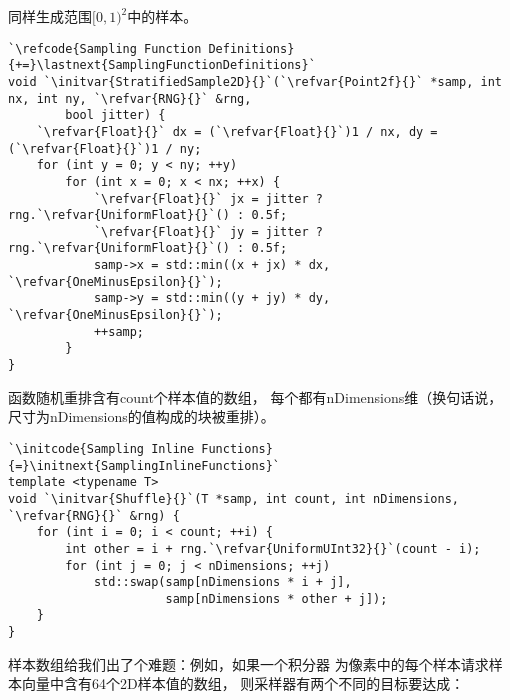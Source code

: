 同样生成范围$[0,1)^2$中的样本。
\begin{lstlisting}
`\refcode{Sampling Function Definitions}{+=}\lastnext{SamplingFunctionDefinitions}`
void `\initvar{StratifiedSample2D}{}`(`\refvar{Point2f}{}` *samp, int nx, int ny, `\refvar{RNG}{}` &rng,
        bool jitter) {
    `\refvar{Float}{}` dx = (`\refvar{Float}{}`)1 / nx, dy = (`\refvar{Float}{}`)1 / ny;
    for (int y = 0; y < ny; ++y)
        for (int x = 0; x < nx; ++x) {
            `\refvar{Float}{}` jx = jitter ? rng.`\refvar{UniformFloat}{}`() : 0.5f;
            `\refvar{Float}{}` jy = jitter ? rng.`\refvar{UniformFloat}{}`() : 0.5f;
            samp->x = std::min((x + jx) * dx, `\refvar{OneMinusEpsilon}{}`);
            samp->y = std::min((y + jy) * dy, `\refvar{OneMinusEpsilon}{}`);
            ++samp;
        }
}
\end{lstlisting}

函数随机重排含有{\ttfamily count}个样本值的数组，
每个都有{\ttfamily nDimensions}维（换句话说，
尺寸为{\ttfamily nDimensions}的值构成的块被重排）。
\begin{lstlisting}
`\initcode{Sampling Inline Functions}{=}\initnext{SamplingInlineFunctions}`
template <typename T>
void `\initvar{Shuffle}{}`(T *samp, int count, int nDimensions, `\refvar{RNG}{}` &rng) {
    for (int i = 0; i < count; ++i) {
        int other = i + rng.`\refvar{UniformUInt32}{}`(count - i);
        for (int j = 0; j < nDimensions; ++j)
            std::swap(samp[nDimensions * i + j],
                      samp[nDimensions * other + j]);
    }
}
\end{lstlisting}

样本数组给我们出了个难题：例如，如果一个积分器
为像素中的每个样本请求样本向量中含有64个2D样本值的数组，
则采样器有两个不同的目标要达成：